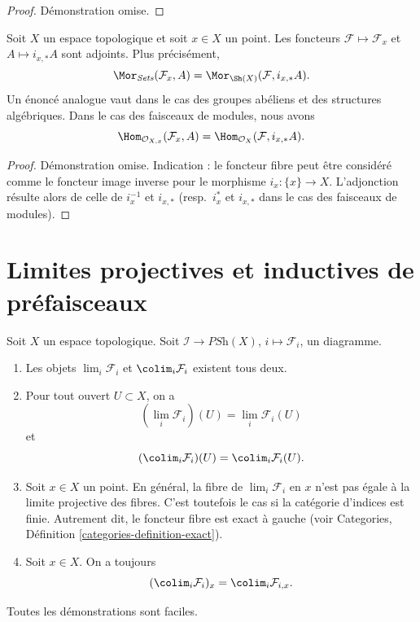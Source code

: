 \begin{proof}
Démonstration omise.
\end{proof}

\begin{lemma}
\label{lemma-stalk-skyscraper-adjoint}
Soit $X$ un espace topologique et soit $x \in X$ un point.
Les foncteurs $\mathcal{F} \mapsto \mathcal{F}_x$ et
$A \mapsto i_{x, *}A$ sont adjoints. Plus précisément,
$$
\Mor_{\textit{Sets}}(\mathcal{F}_x, A)
=
\Mor_{\Sh(X)}(\mathcal{F}, i_{x, *}A).
$$
Un énoncé analogue vaut dans le cas des
groupes abéliens et des structures algébriques. Dans le cas des
faisceaux de modules, nous avons
$$
\Hom_{\mathcal{O}_{X, x}}(\mathcal{F}_x, A)
=
\Hom_{\mathcal{O}_X}(\mathcal{F}, i_{x, *}A).
$$
\end{lemma}

\begin{proof}
Démonstration omise. Indication : le foncteur fibre peut être
considéré comme le foncteur image inverse pour le morphisme $i_x : \{x\} \to X$.
L'adjonction résulte alors de celle de
$i_x^{-1}$ et $i_{x, *}$ (resp.\ $i_x^*$ et $i_{x, *}$
dans le cas des faisceaux de modules).
\end{proof}






\section{Limites projectives et inductives de préfaisceaux}
\label{section-limits-presheaves}

\noindent
Soit $X$ un espace topologique.
Soit $\mathcal{I} \to \textit{PSh}(X)$, $i \mapsto \mathcal{F}_i$,
un diagramme.
\begin{enumerate}
\item Les objets $\lim_i \mathcal{F}_i$ et $\colim_i \mathcal{F}_i$
existent tous deux.
\item Pour tout ouvert $U \subset X$, on a
$$
(\lim_i \mathcal{F}_i)(U) =
\lim_i \mathcal{F}_i(U)
$$
et
$$
(\colim_i \mathcal{F}_i)(U) =
\colim_i \mathcal{F}_i(U).
$$
\item Soit $x \in X$ un point. En général, la fibre de
$\lim_i \mathcal{F}_i$ en $x$ n'est pas égale à
la limite projective des fibres. C'est toutefois le cas si la catégorie d'indices est finie.
Autrement dit, le foncteur fibre est
exact à gauche (voir Categories, Définition \ref{categories-definition-exact}).
\item Soit $x \in X$. On a toujours
$$
(\colim_i \mathcal{F}_i)_x =
\colim_i \mathcal{F}_{i, x}.
$$
\end{enumerate}
Toutes les démonstrations sont faciles.

